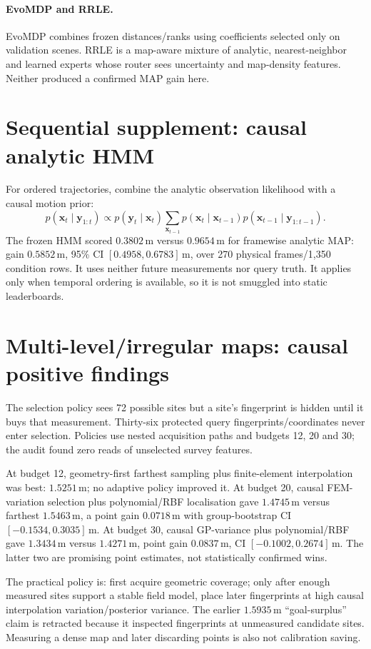 \documentclass[10pt,a4paper]{article}
\newcommand{\m}{\,\mathrm{m}}
\begin{document}
\paragraph{EvoMDP and RRLE.} EvoMDP combines frozen distances/ranks using coefficients selected only on validation scenes. RRLE is a map-aware mixture of analytic, nearest-neighbor and learned experts whose router sees uncertainty and map-density features. Neither produced a confirmed MAP gain here.

\section{Sequential supplement: causal analytic HMM}
For ordered trajectories, combine the analytic observation likelihood with a causal motion prior:
\[
p(\mathbf x_t\mid\mathbf y_{1:t})\propto p(\mathbf y_t\mid\mathbf x_t)
\sum_{\mathbf x_{t-1}}p(\mathbf x_t\mid\mathbf x_{t-1})p(\mathbf x_{t-1}\mid\mathbf y_{1:t-1}).
\]
The frozen HMM scored $0.3802\m$ versus $0.9654\m$ for framewise analytic MAP: gain $0.5852\m$, 95\% CI $[0.4958,0.6783]\m$, over 270 physical frames/1,350 condition rows. It uses neither future measurements nor query truth. It applies only when temporal ordering is available, so it is not smuggled into static leaderboards.

\section{Multi-level/irregular maps: causal positive findings}
The selection policy sees 72 possible sites but a site's fingerprint is hidden until it buys that measurement. Thirty-six protected query fingerprints/coordinates never enter selection. Policies use nested acquisition paths and budgets 12, 20 and 30; the audit found zero reads of unselected survey features.

At budget 12, geometry-first farthest sampling plus finite-element interpolation was best: $1.5251\m$; no adaptive policy improved it. At budget 20, causal FEM-variation selection plus polynomial/RBF localisation gave $1.4745\m$ versus farthest $1.5463\m$, a point gain $0.0718\m$ with group-bootstrap CI $[-0.1534,0.3035]\m$. At budget 30, causal GP-variance plus polynomial/RBF gave $1.3434\m$ versus $1.4271\m$, point gain $0.0837\m$, CI $[-0.1002,0.2674]\m$. The latter two are promising point estimates, not statistically confirmed wins.

The practical policy is: first acquire geometric coverage; only after enough measured sites support a stable field model, place later fingerprints at high causal interpolation variation/posterior variance. The earlier $1.5935\m$ ``goal-surplus'' claim is retracted because it inspected fingerprints at unmeasured candidate sites. Measuring a dense map and later discarding points is also not calibration saving.
\end{document}
